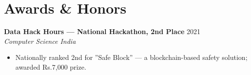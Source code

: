 \documentclass[10pt,letterpaper]{article}
\begin{document}
\section{Awards \& Honors}

\textbf{Data Hack Hours --- National Hackathon, 2nd Place} \hfill 2021 \\
\textit{Computer Science India}
\begin{itemize}
  \item Nationally ranked 2nd for ''Safe Block'' --- a blockchain-based safety solution; awarded Rs.7,000 prize.
\end{itemize}
\end{document}
